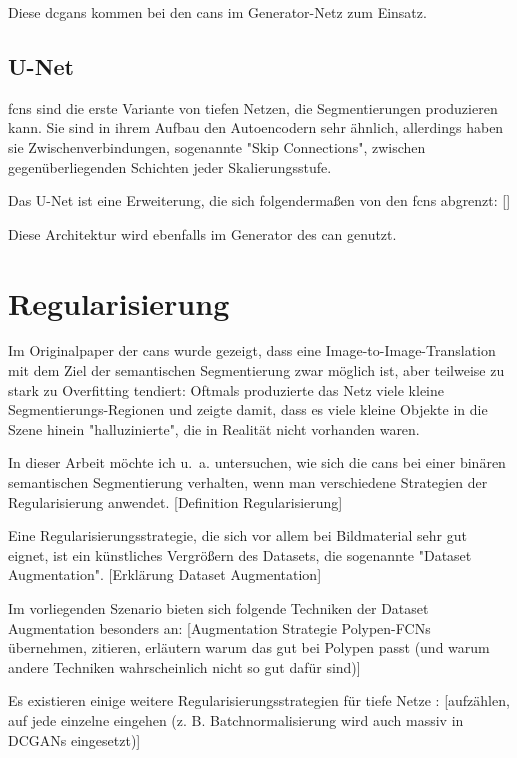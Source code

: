 Diese \glspl{dcgan} kommen bei den \glspl{can} im Generator-Netz zum Einsatz.

\subsection{U-Net}

\glspl{fcn} sind die erste Variante von tiefen Netzen, die Segmentierungen produzieren kann.
Sie sind in ihrem Aufbau den Autoencodern sehr ähnlich, allerdings haben sie Zwischenverbindungen, sogenannte "Skip Connections", zwischen gegenüberliegenden Schichten jeder Skalierungsstufe.

Das U-Net ist eine Erweiterung, die sich folgendermaßen von den \glspl{fcn} abgrenzt:
[]

Diese Architektur wird ebenfalls im Generator des \gls{can} genutzt.

\section{Regularisierung}

Im Originalpaper der \glspl{can} wurde gezeigt, dass eine Image-to-Image-Translation mit dem Ziel der semantischen Segmentierung zwar möglich ist, aber teilweise zu stark zu Overfitting tendiert:
Oftmals produzierte das Netz viele kleine Segmentierungs-Regionen und zeigte damit, dass es viele kleine Objekte in die Szene hinein "halluzinierte", die in Realität nicht vorhanden waren.

In dieser Arbeit möchte ich u.~a. untersuchen, wie sich die \glspl{can} bei einer binären semantischen Segmentierung verhalten, wenn man verschiedene Strategien der Regularisierung anwendet.
[Definition Regularisierung]

Eine Regularisierungsstrategie, die sich vor allem bei Bildmaterial sehr gut eignet, ist ein künstliches Vergrößern des Datasets, die sogenannte "Dataset Augmentation".
[Erklärung Dataset Augmentation]

Im vorliegenden Szenario bieten sich folgende Techniken der Dataset Augmentation besonders an:
[Augmentation Strategie Polypen-FCNs übernehmen, zitieren, erläutern warum das gut bei Polypen passt (und warum andere Techniken wahrscheinlich nicht so gut dafür sind)]

Es existieren einige weitere Regularisierungsstrategien für tiefe Netze \cite{Goodfellow.2016}:
[aufzählen, auf jede einzelne eingehen (z. B. Batchnormalisierung wird auch massiv in DCGANs eingesetzt)]

